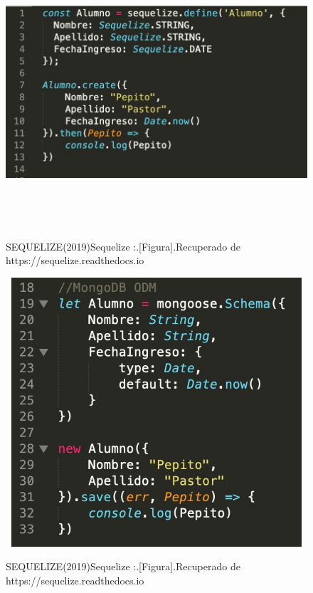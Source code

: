 \documentclass[preprint,12pt]{elsarticle}
\begin{document}
\begin{figure}[H]
			\begin{center}
					\includegraphics[width=14cm,height=10cm]{./IMAGENES/codigo2}
			\end{center}
			SEQUELIZE(2019)Sequelize :.[Figura].Recuperado de 
			https://sequelize.readthedocs.io
		\end{figure}

\begin{figure}[H]
			\begin{center}
					\includegraphics[width=14cm,height=10cm]{./IMAGENES/codigo3}
			\end{center}
			SEQUELIZE(2019)Sequelize :.[Figura].Recuperado de 
			https://sequelize.readthedocs.io
		\end{figure}
\end{document}

